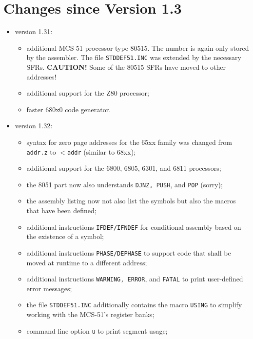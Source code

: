 \documentclass[12pt,twoside]{report}
\newcommand{\bb}[1]{{\bf #1}}
\newcommand{\tty}[1]{{\tt #1}}
\begin{document}

\cleardoublepage
\chapter{Changes since Version 1.3}

\begin{itemize}
\item{version 1.31:
      \begin{itemize}
      \item{additional MCS-51 processor type 80515.  The number
            is again only stored by the assembler.  The file
            \tty{STDDEF51.INC} was extended by the necessary SFRs.
            \bb{CAUTION!} Some of the 80515 SFRs have moved to other
            addresses!}
      \item{additional support for the Z80 processor;}
      \item{faster 680x0 code generator.}
      \end{itemize}}
\item{version 1.32:
      \begin{itemize}
      \item{syntax for zero page addresses for the 65xx family
            was changed from \tty{addr.z} to \tty{$<$addr} (similar to 68xx);}
      \item{additional support for the 6800, 6805, 6301, and
            6811 processors;}
      \item{the 8051 part now also understands \tty{DJNZ, PUSH}, and
            \tty{POP} (sorry);}
      \item{the assembly listing now not also list the symbols
            but also the macros that have been defined;}
      \item{additional instructions \tty{IFDEF/IFNDEF} for conditional
            assembly based on the existence of a symbol;}
      \item{additional instructions \tty{PHASE/DEPHASE} to support code
            that shall be moved at runtime to a different address;}
      \item{additional instructions \tty{WARNING, ERROR}, and \tty{FATAL} to print
            user-defined error messages;}
      \item{the file \tty{STDDEF51.INC} additionally contains the macro
            \tty{USING} to simplify working with the MCS-51's register
            banks;}
      \item{command line option \tty{u} to print segment usage;}

\end{itemize}}
\end{itemize}
\end{document}
